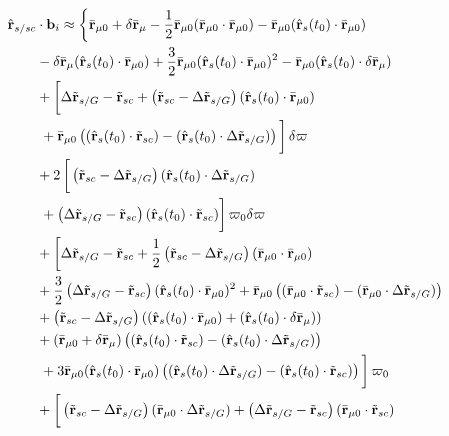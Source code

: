 \begin{figure}[ht]
\begin{equation}\label{eq:rhat_expand3}
\begin{split}
\hat\R_{s/sc} &\cdot \mf b_i \approx
\left\{\bar\R_{\mu0} + \delta\bar\R_\mu - \frac{1}{2} \bar\R_{\mu0} (\bar\R_{\mu0} \cdot \bar\R_{\mu0}) - \bar\R_{\mu0} (\hat\R_s(t_0) \cdot \bar\R_{\mu0})\right.\\
& {} - \delta\bar\R_\mu (\hat\R_s(t_0) \cdot \bar\R_{\mu0}) + \frac{3}{2} \bar\R_{\mu0} (\hat\R_s(t_0) \cdot \bar\R_{\mu0})^2 - \bar\R_{\mu0} (\hat\R_s(t_0) \cdot \delta\bar\R_\mu) \\ 
%
&{} + \left[\vphantom{\frac{1}{2}}\Delta \tilde\R_{s/G} - \tilde\R_{sc} +\left(\tilde\R_{sc} -  \Delta \tilde\R_{s/G}\right) (\hat\R_s(t_0) \cdot \bar\R_{\mu0}) \right.\\
&\left.{} + \bar\R_{\mu0}\left((\hat\R_s(t_0) \cdot \tilde\R_{sc}) -(\hat\R_s(t_0) \cdot \Delta \tilde\R_{s/G})\right)\vphantom{\frac{1}{2}}\right] \delta\varpi\\ 
%
&{} + 2\left[\vphantom{\frac{1}{2}}\left(\tilde\R_{sc}  -\Delta \tilde\R_{s/G}\right) (\hat\R_s(t_0) \cdot \Delta \tilde\R_{s/G})\right.\\
&\left.{}  + \left(\Delta \tilde\R_{s/G} - \tilde\R_{sc}\right)(\hat\R_s(t_0) \cdot \tilde\R_{sc})\vphantom{\frac{1}{2}}\right]\varpi_0\delta\varpi\\
%
&{} + \left[\Delta \tilde\R_{s/G} - \tilde\R_{sc} + \frac{1}{2}\left(\tilde\R_{sc} -\Delta \tilde\R_{s/G}\right) (\bar\R_{\mu0} \cdot \bar\R_{\mu0}) \right.\\
&{}+ \frac{3}{2} \left(\Delta \tilde\R_{s/G} -  \tilde\R_{sc} \right)(\hat\R_s(t_0) \cdot \bar\R_{\mu0})^2   + \bar\R_{\mu0} \left((\bar\R_{\mu0}\cdot \tilde\R_{sc}) -  (\bar\R_{\mu0} \cdot \Delta \tilde\R_{s/G})\right) \\
&{}     + \left(\tilde\R_{sc} - \Delta \tilde\R_{s/G}\right)\left((\hat\R_s(t_0) \cdot \bar\R_{\mu0}) + (\hat\R_s(t_0) \cdot \delta\bar\R_\mu)\right) \\
&{}+ \left(\bar\R_{\mu0} + \delta\bar\R_\mu\right)\left( (\hat\R_s(t_0) \cdot \tilde\R_{sc}) - (\hat\R_s(t_0) \cdot \Delta \tilde\R_{s/G}) \right)\\
&\left.{} + 3\bar\R_{\mu0} (\hat\R_s(t_0) \cdot \bar\R_{\mu0})\left( (\hat\R_s(t_0) \cdot \Delta \tilde\R_{s/G})  - (\hat\R_s(t_0) \cdot \tilde\R_{sc})\right)\vphantom{\frac{1}{2}}\right]\varpi_0\\
%
&{} + \left[\vphantom{\frac{1}{2}} \left(\tilde\R_{sc} -\Delta \tilde\R_{s/G}\right) (\bar\R_{\mu0} \cdot \Delta \tilde\R_{s/G}) + \left(\Delta \tilde\R_{s/G} -   \tilde\R_{sc}\right)(\bar\R_{\mu0}\cdot \tilde\R_{sc})\right.\\

\end{split}
\end{equation}
\end{figure}
